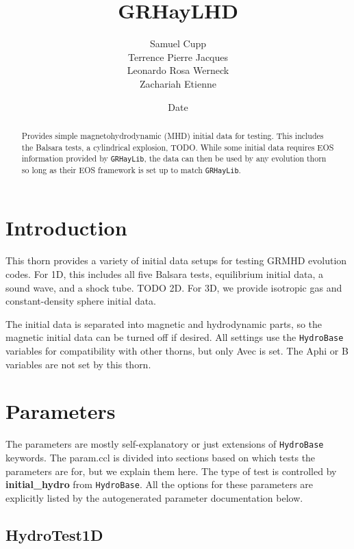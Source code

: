 \documentclass{article}
\newcommand{\hydrobase}{\texttt{HydroBase}\xspace}
\begin{document}
\title{GRHayLHD}
\author{Samuel Cupp \\ Terrence Pierre Jacques \\ Leonardo Rosa Werneck \\ Zachariah Etienne}
\date{$ $Date$ $}

\maketitle


\begin{abstract}
Provides simple magnetohydrodynamic (MHD) initial data for testing.
This includes the Balsara tests, a cylindrical explosion, TODO. While
some initial data requires EOS information provided by \texttt{GRHayLib},
the data can then be used by any evolution thorn so long as their EOS
framework is set up to match \texttt{GRHayLib}.
\end{abstract}

\section{Introduction}

This thorn provides a variety of initial data setups for
testing GRMHD evolution codes. For 1D, this includes all five
Balsara tests, equilibrium initial data, a sound wave, and
a shock tube. TODO 2D. For 3D, we provide isotropic gas and
constant-density sphere initial data.

The initial data is separated into magnetic and hydrodynamic
parts, so the magnetic initial data can be turned off if desired.
All settings use the \hydrobase variables for compatibility with
other thorns, but only Avec is set. The Aphi or B variables are
not set by this thorn.

\section{Parameters}

The parameters are mostly self-explanatory or just extensions of
\hydrobase keywords. The param.ccl is divided into sections based
on which tests the parameters are for, but we explain them here.
The type of test is controlled by \textbf{initial\_hydro} from
\hydrobase. All the options for these parameters are explicitly
listed by the autogenerated parameter documentation below.

\subsection{HydroTest1D}
\end{document}
